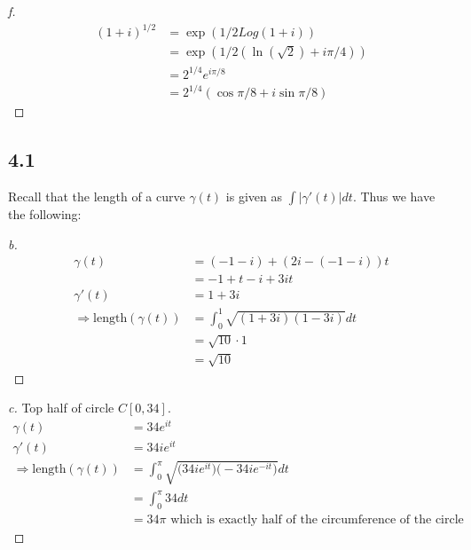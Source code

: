 \documentclass[a4paper, 11pt]{article}
\begin{document}
	\begin{proof}[f]
		\begin{align*}
			(1+i)^{1/2} &= \exp(1/2 Log(1+i)) \\ 
				&= \exp(1/2(\ln(\sqrt{2})+i\pi/4)) \\ 
				&= 2^{1/4}e^{i\pi/8} \\ 
				&= 2^{1/4}(\cos\pi/8 + i\sin\pi/8)
		\end{align*}
	\end{proof}



\subsection*{4.1}
	Recall that the length of a curve $\gamma(t)$ is given as $\int |\gamma'(t)|dt$. Thus we have the following: 
	
	\begin{proof}[b]
		\begin{align*}
			\gamma(t) &= (-1-i)+(2i-(-1-i))t \\ 
				&= -1+t-i+3it \\ 
			\gamma'(t) &= 1+3i \\ 
			\Rightarrow \text{length}(\gamma(t)) &= \int_0^1 \sqrt{(1+3i)(1-3i)}dt \\ 
				&= \sqrt{10}\cdot 1 \\ 
				&= \sqrt{10} 
		\end{align*}
	\end{proof}

	\begin{proof}[c]
		Top half of circle $C[0,34]$. 
		\begin{align*}
			\gamma(t) &= 34e^{it} \\ 
			\gamma'(t) &= 34ie^{it} \\ 
			\Rightarrow \text{length}(\gamma(t)) &= \int_0^{\pi} \sqrt{\big(34ie^{it}\big)\big(-34ie^{-it}\big)}dt \\ 
			&= \int_0^{\pi} 34 dt \\ 
			&= 34\pi \text{ which is exactly half of the circumference of the circle}
		\end{align*}
	\end{proof}
\end{document}
